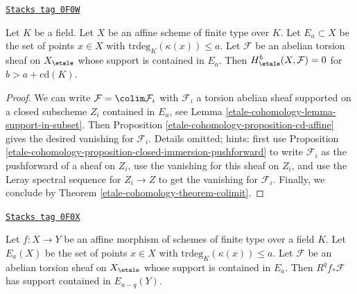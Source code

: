 \begin{lemma}[Interlude II]
\label{etale-cohomology-lemma-interlude-II}
\href{https://stacks.math.columbia.edu/tag/0F0W}{\texttt{Stacks tag 0F0W}}

Let $K$ be a field. Let $X$ be an affine scheme of finite type over $K$.
Let $E_a \subset X$ be the set of points
$x \in X$ with $\text{trdeg}_K(\kappa(x)) \leq a$.
Let $\mathcal{F}$ be an abelian torsion sheaf on $X_\etale$
whose support is contained in $E_a$. Then
$H^b_\etale(X, \mathcal{F}) = 0$ for $b > a + \text{cd}(K)$.
\end{lemma}

\begin{proof}
We can write $\mathcal{F} = \colim \mathcal{F}_i$
with $\mathcal{F}_i$ a torsion abelian sheaf
supported on a closed subscheme $Z_i$ contained in $E_a$, see
Lemma \ref{etale-cohomology-lemma-support-in-subset}.
Then Proposition \ref{etale-cohomology-proposition-cd-affine} gives
the desired vanishing for $\mathcal{F}_i$. Details omitted;
hints: first use Proposition \ref{etale-cohomology-proposition-closed-immersion-pushforward}
to write $\mathcal{F}_i$ as the pushforward of a sheaf on $Z_i$,
use the vanishing for this sheaf on $Z_i$, and use
the Leray spectral sequence for $Z_i \to Z$ to get the vanishing
for $\mathcal{F}_i$. Finally, we
conclude by Theorem \ref{etale-cohomology-theorem-colimit}.
\end{proof}

\begin{lemma}[Interlude I]
\label{etale-cohomology-lemma-interlude-I}
\href{https://stacks.math.columbia.edu/tag/0F0X}{\texttt{Stacks tag 0F0X}}

Let $f : X \to Y$ be an affine morphism of schemes of finite
type over a field $K$. Let $E_a(X)$ be the set of points $x \in X$
with $\text{trdeg}_K(\kappa(x)) \leq a$.
Let $\mathcal{F}$ be an abelian torsion sheaf on $X_\etale$
whose support is contained in $E_a$. Then
$R^qf_*\mathcal{F}$ has support contained in
$E_{a - q}(Y)$.
\end{lemma}

